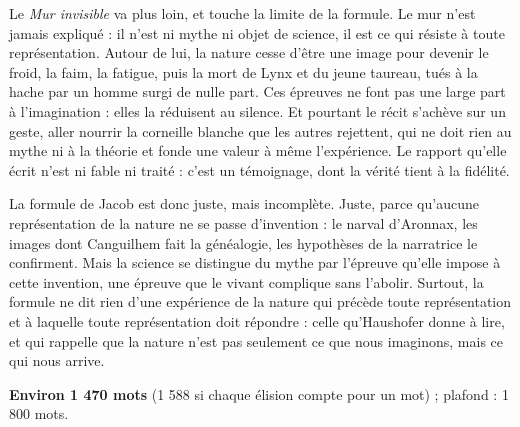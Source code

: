 \documentclass[11pt,a4paper]{article}
\begin{document}
Le \emph{Mur invisible} va plus loin, et touche la limite de la formule. Le mur n'est jamais expliqué : il n'est ni mythe ni objet de science, il est ce qui résiste à toute représentation. Autour de lui, la nature cesse d'être une image pour devenir le froid, la faim, la fatigue, puis la mort de Lynx et du jeune taureau, tués à la hache par un homme surgi de nulle part. Ces épreuves ne font pas une large part à l'imagination : elles la réduisent au silence. Et pourtant le récit s'achève sur un geste, aller nourrir la corneille blanche que les autres rejettent, qui ne doit rien au mythe ni à la théorie et fonde une valeur à même l'expérience. Le rapport qu'elle écrit n'est ni fable ni traité : c'est un témoignage, dont la vérité tient à la fidélité.

La formule de Jacob est donc juste, mais incomplète. Juste, parce qu'aucune représentation de la nature ne se passe d'invention : le narval d'Aronnax, les images dont Canguilhem fait la généalogie, les hypothèses de la narratrice le confirment. Mais la science se distingue du mythe par l'épreuve qu'elle impose à cette invention, une épreuve que le vivant complique sans l'abolir. Surtout, la formule ne dit rien d'une expérience de la nature qui précède toute représentation et à laquelle toute représentation doit répondre : celle qu'Haushofer donne à lire, et qui rappelle que la nature n'est pas seulement ce que nous imaginons, mais ce qui nous arrive.

\textbf{Environ 1 470 mots} (1 588 si chaque élision compte pour un mot) ; plafond : 1 800 mots.
\end{document}
